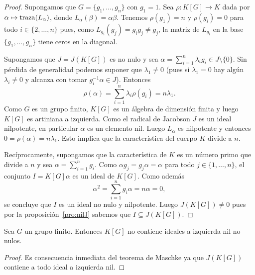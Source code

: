 \begin{proof}
	Supongamos que $G=\{g_1,\dots,g_n\}$ con $g_1=1$. Sea $\rho\colon K[G]\to
	K$ dada por $\alpha\mapsto\operatorname{traza}(L_{\alpha})$, donde
	$L_{\alpha}(\beta)=\alpha\beta$. Tenemos $\rho(g_1)=n$ y $\rho(g_i)=0$ para
	todo $i\in\{2,\dots,n\}$ pues,  como $L_{g_i}(g_j)=g_{i}g_j\ne g_j$, la
	matriz de $L_{g_i}$ en la base $\{g_1,\dots,g_n\}$ tiene ceros en la
	diagonal.

	Supongamos que $J=J(K[G])$ es no nulo y sea
	$\alpha=\sum_{i=1}^n\lambda_ig_i\in J\setminus\{0\}$. Sin pérdida de
	generalidad podemos suponer que $\lambda_1\ne 0$ (pues si $\lambda_1=0$ hay
	algún $\lambda_i\ne 0$ y alcanza con tomar $g_i^{-1}\alpha\in J$). Entonces
	\[
		\rho(\alpha)=\sum_{i=1}^n \lambda_i\rho(g_i)=n\lambda_1.
	\]
	Como $G$ es un grupo finito, $K[G]$ es un álgebra de dimensión finita y
	luego $K[G]$ es artiniana a izquierda. Como el radical de Jacobson $J$ es
	un ideal nilpotente, en particular $\alpha$ es un elemento nil. Luego
	$L_{\alpha}$ es nilpotente y entonces $0=\rho(\alpha)=n\lambda_1$. Esto
	implica que la característica del cuerpo $K$ divide a $n$. 

	Recíprocamente, supongamos que la característica de $K$ es un número primo
	que divide a $n$ y sea $\alpha=\sum_{i=1}^ng_i$. Como $\alpha
	g_j=g_j\alpha=\alpha$ para todo $j\in\{1,\dots,n\}$, el conjunto
	$I=K[G]\alpha$ es un ideal de $K[G]$. Como además 
	\[
		\alpha^2=\sum_{i=1}^n g_i\alpha=n\alpha=0,
	\]
	se concluye que $I$ es un ideal no nulo y nilpotente. Luego $J(K[G])\ne 0$
	pues por la proposición~\ref{pro:nilJ} sabemos que $I\subseteq J(K[G])$.
\end{proof}

\begin{corollary}
	\label{cor:GfinitoNOnil}
	Sea $G$ un grupo finito. Entonces $K[G]$ no contiene ideales a izquierda
	nil no nulos.
\end{corollary}

\begin{proof}
	Es consecuencia inmediata del teorema de Maschke ya que $J(K[G])$ contiene a
	todo ideal a izquierda nil.	
\end{proof}


